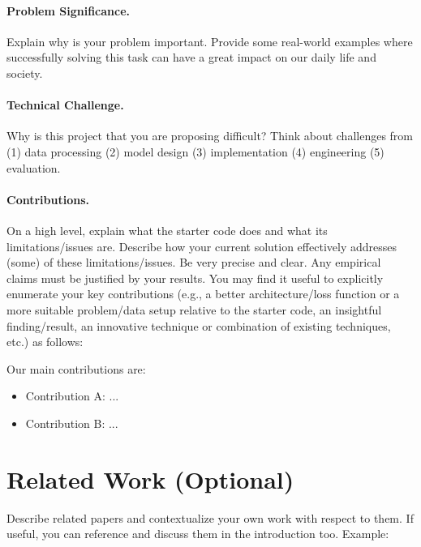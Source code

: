 \documentclass{article}
\begin{document}
\paragraph{Problem Significance.}
Explain  why is your problem important. Provide some real-world examples where successfully solving this task can have a great impact on our daily life and society. 

\paragraph{Technical Challenge.}
Why is this project that you are proposing difficult? Think about challenges from (1) data processing (2) model design (3) implementation (4) engineering (5) evaluation. 


\paragraph{Contributions.}
 On a high level, explain what the starter code does and what its limitations/issues are. Describe how your current solution effectively addresses (some) of these limitations/issues. Be very precise and clear. Any empirical claims must be justified by your results. You may find it useful to explicitly enumerate your key contributions (e.g., a better architecture/loss function or a more suitable problem/data setup relative to the starter code, an insightful finding/result, an innovative technique or combination of existing techniques, etc.) as follows:



Our main contributions are:
\begin{itemize}
  \item Contribution A: ...
  \item Contribution B: ...  
\end{itemize}

\section{Related Work (Optional)}
\label{sec:relatedwork}
Describe related papers and contextualize your own work with respect to them. If useful, you can reference and discuss them in the introduction too. Example:
\end{document}
